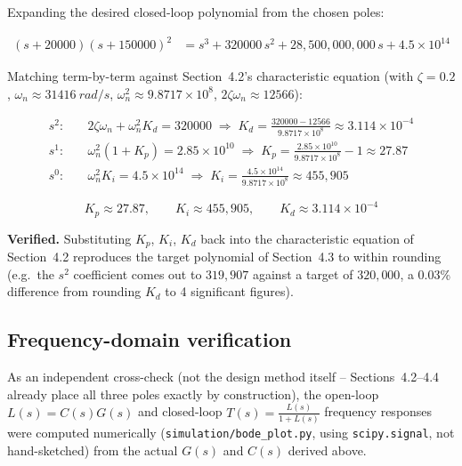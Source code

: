 \documentclass[11pt,letterpaper]{article}
\begin{document}
Expanding the desired closed-loop polynomial from the chosen poles:

\begin{align}
(s+20000)(s+150000)^2 &= s^3 + 320000\,s^2 + 28{,}500{,}000{,}000\,s + 4.5\times10^{14}
\end{align}

Matching term-by-term against Section~4.2's characteristic equation (with $\zeta=0.2$,
$\omega_n\approx\SI{31416}{rad/s}$, $\omega_n^2\approx9.8717\times10^8$, $2\zeta\omega_n\approx12566$):

\begin{align}
s^2:&\quad 2\zeta\omega_n+\omega_n^2 K_d = 320000 \;\Rightarrow\; K_d = \frac{320000-12566}{9.8717\times10^8} \approx 3.114\times10^{-4} \\
s^1:&\quad \omega_n^2(1+K_p) = 2.85\times10^{10} \;\Rightarrow\; K_p = \frac{2.85\times10^{10}}{9.8717\times10^8}-1 \approx 27.87 \\
s^0:&\quad \omega_n^2 K_i = 4.5\times10^{14} \;\Rightarrow\; K_i = \frac{4.5\times10^{14}}{9.8717\times10^8} \approx 455{,}905
\end{align}

\begin{tcolorbox}[colback=blue!5,colframe=blue!40!black,arc=1mm]
\begin{equation}
\boxed{K_p \approx 27.87, \qquad K_i \approx 455{,}905, \qquad K_d \approx 3.114\times10^{-4}}
\end{equation}
\end{tcolorbox}

\textbf{Verified.} Substituting $K_p$, $K_i$, $K_d$ back into the characteristic equation of Section~4.2
reproduces the target polynomial of Section~4.3 to within rounding (e.g.\ the $s^2$ coefficient comes out
to $319{,}907$ against a target of $320{,}000$, a 0.03\% difference from rounding $K_d$ to 4 significant
figures).

\subsection{Frequency-domain verification}

As an independent cross-check (not the design method itself -- Sections~4.2--4.4 already place all three
poles exactly by construction), the open-loop $L(s)=C(s)G(s)$ and closed-loop $T(s)=\frac{L(s)}{1+L(s)}$
frequency responses were computed numerically (\texttt{simulation/bode\_plot.py}, using
\texttt{scipy.signal}, not hand-sketched) from the actual $G(s)$ and $C(s)$ derived above.
\end{document}
